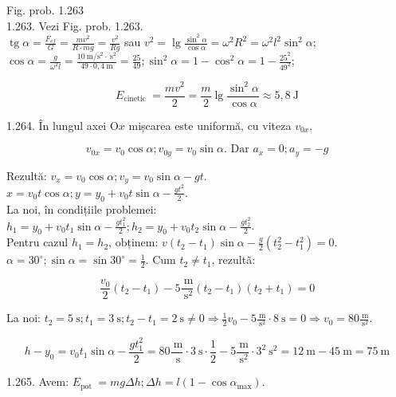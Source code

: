 \documentclass[10pt]{article}
\begin{document}
Fig. prob. 1.263\\
1.263. Vezi Fig. prob. 1.263.\\
$\operatorname{tg} \alpha=\frac{F_{c f}}{G}=\frac{m v^{2}}{R \cdot m g}=\frac{v^{2}}{R g}$ sau $v^{2}=\lg \frac{\sin ^{2} \alpha}{\cos \alpha}=\omega^{2} R^{2}=\omega^{2} l^{2} \sin ^{2} \alpha ;$\\
$\cos \alpha=\frac{g}{\omega^{2} l}=\frac{10 \mathrm{~m} / \mathrm{s}^{2} \cdot \mathrm{~s}^{2}}{49 \cdot 0,4 \mathrm{~m}}=\frac{25}{49} ; \sin ^{2} \alpha=1-\cos ^{2} \alpha=1-\frac{25^{2}}{49^{2}}$;

$$
E_{\text {cinetic }}=\frac{m v^{2}}{2}=\frac{m}{2} \lg \frac{\sin ^{2} \alpha}{\cos \alpha} \approx 5,8 \mathrm{~J}
$$

1.264. În lungul axei $\mathrm{O} x$ mișcarea este uniformă, cu viteza $v_{0 x}$.

$$
v_{0 x}=v_{0} \cos \alpha ; v_{0 y}=v_{0} \sin \alpha . \text { Dar } a_{x}=0 ; a_{y}=-g
$$

Rezultă: $v_{x}=v_{0} \cos \alpha ; v_{y}=v_{0} \sin \alpha-g t$.\\
$x=v_{0} t \cos \alpha ; y=y_{0}+v_{0} t \sin \alpha-\frac{g t^{2}}{2}$.\\
La noi, în condițiile problemei:\\
$h_{1}=y_{0}+v_{0} t_{1} \sin \alpha-\frac{g t_{1}^{2}}{2} ; h_{2}=y_{0}+v_{0} t_{2} \sin \alpha-\frac{g t_{2}^{2}}{2}$.\\
Pentru cazul $h_{1}=h_{2}$, obținem: $v\left(t_{2}-t_{1}\right) \sin \alpha-\frac{g}{2}\left(t_{2}^{2}-t_{1}^{2}\right)=0$.\\
$\alpha=30^{\circ} ; \sin \alpha=\sin 30^{\circ}=\frac{1}{2}$. Cum $t_{2} \neq t_{1}$, rezultã:

$$
\frac{v_{0}}{2}\left(t_{2}-t_{1}\right)-5 \frac{\mathrm{~m}}{\mathrm{~s}^{2}}\left(t_{2}-t_{1}\right)\left(t_{2}+t_{1}\right)=0
$$

La noi: $t_{2}=5 \mathrm{~s} ; t_{1}=3 \mathrm{~s} ; t_{2}-t_{1}=2 \mathrm{~s} \neq 0 \Rightarrow \frac{1}{2} v_{0}-5 \frac{\mathrm{~m}}{\mathrm{~s}^{2}} \cdot 8 \mathrm{~s}=0 \Rightarrow v_{0}=80 \frac{\mathrm{~m}}{\mathrm{~s}^{2}}$.

$$
h-y_{0}=v_{0} t_{1} \sin \alpha-\frac{g t_{1}^{2}}{2}=80 \frac{\mathrm{~m}}{\mathrm{~s}} \cdot 3 \mathrm{~s} \cdot \frac{1}{2}-5 \frac{\mathrm{~m}}{\mathrm{~s}^{2}} \cdot 3^{2} \mathrm{~s}^{2}=12 \mathrm{~m}-45 \mathrm{~m}=75 \mathrm{~m}
$$

1.265. Avem: $E_{\text {pot }}=m g \Delta h ; \Delta h=l\left(1-\cos \alpha_{\max }\right)$.
\end{document}
